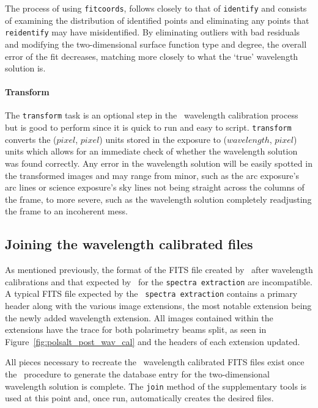 The process of using \texttt{fitcoords}, follows closely to that of \texttt{identify} and consists of examining the distribution of identified points and eliminating any points that \texttt{reidentify} may have misidentified. By eliminating outliers with bad residuals and modifying the two-dimensional surface function type and degree, the overall error of the fit decreases, matching more closely to what the `true' wavelength solution is.

\paragraph{Transform}
The \texttt{transform} task is an optional step in the \iraf\ wavelength calibration process but is good to perform since it is quick to run and easy to script. \texttt{transform} converts the ($pixel$, $pixel$) units stored in the exposure to ($wavelength$, $pixel$) units which allows for an immediate check of whether the wavelength solution was found correctly. Any error in the wavelength solution will be easily spotted in the transformed images and may range from minor, such as the arc exposure's arc lines or science exposure's sky lines not being straight across the columns of the frame, to more severe, such as the wavelength solution completely readjusting the frame to an incoherent mess.



\subsection{Joining the wavelength calibrated files}

As mentioned previously, the format of the \gls{FITS} file created by \iraf\ after wavelength calibrations and that expected by \polsalt\ for the \texttt{spectra extraction} are incompatible. A typical \gls{FITS} file expected by the \polsalt\ \texttt{spectra extraction} contains a primary header along with the various image extensions, the most notable extension being the newly added wavelength extension. All images contained within the extensions have the trace for both polarimetry beams split, as seen in Figure~\ref{fig:polsalt_post_wav_cal} and the headers of each extension updated.
\prgph

All pieces necessary to recreate the \polsalt\ wavelength calibrated \gls{FITS} files exist once the \iraf\ procedure to generate the database entry for the two-dimensional wavelength solution is complete. The \texttt{join} method of the supplementary tools is used at this point and, once run, automatically creates the desired files.
\prgph

